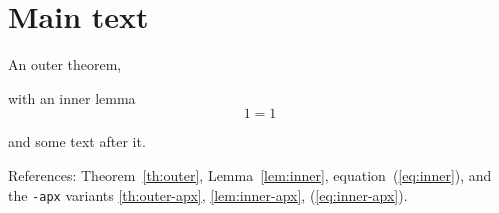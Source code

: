 \documentclass{article}
\begin{document}
\section{Main text}

\begin{theoremrep}\label{th:outer}%
  An outer theorem,
  \begin{lemmarep}\label{lem:inner}%
    with an inner lemma
    \begin{equation}\label{eq:inner}1=1\end{equation}
  \end{lemmarep}
  and some text after it.
\end{theoremrep}

References: Theorem~\ref{th:outer}, Lemma~\ref{lem:inner},
equation~(\ref{eq:inner}), and the \texttt{-apx} variants
\ref{th:outer-apx}, \ref{lem:inner-apx}, (\ref{eq:inner-apx}).
\end{document}
